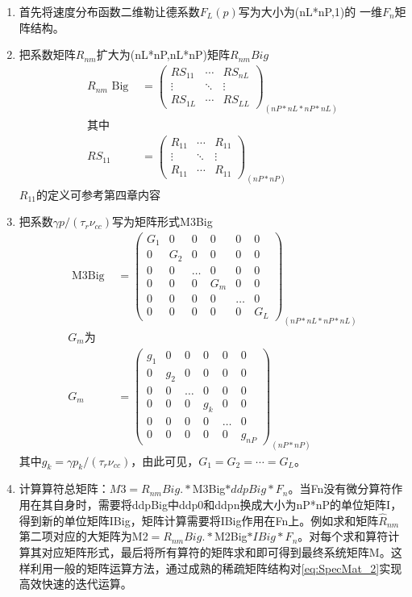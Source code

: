 \begin{enumerate}
\item
首先将速度分布函数二维勒让德系数$F_L(p)$写为大小为(nL*nP,1)的 一维$F_n$矩阵结构。
\item
把系数矩阵$R_{nm}$扩大为(nL*nP,nL*nP)矩阵$R_{nm} Big$
\begin{align}R_{n m} \text { Big } & = \left(\begin{array}{ccc}R S_{11} & \cdots & R S_{n L} \\\vdots & \ddots & \vdots \\R S_{1 L} & \cdots & R S_{L L}\end{array}\right)_{(nP*nL*nP*nL)}\\
\text{其中}\\
R S_{11}&=\left(\begin{array}{ccc}R_{11} & \cdots & R_{11} \\\vdots & \ddots & \vdots \\R_{11} & \cdots & R_{11}\end{array}\right)_{(nP*nP)}
\end{align}
$R_{11}$的定义可参考第四章内容
\item
把系数$γp/(τ_r ν_{cc} )$写为矩阵形式M3Big
\begin{align}\text { M3Big } & = \left(\begin{array}{cccccc}G_{1} & 0 & 0 & 0 & 0 & 0 \\0 & G_{2} & 0 & 0 & 0 & 0 \\0 & 0 & \ldots & 0 & 0 & 0 \\0 & 0 & 0 & G_{m} & 0 & 0 \\0 & 0 & 0 & 0 & \ldots & 0 \\0 & 0 & 0 & 0 & 0 & G_{L}\end{array}\right)_{(nP*nL*nP*nL)}\\
G_m\text{为}\\
 { G_m} & = \left(\begin{array}{cccccc}g_{1} & 0 & 0 & 0 & 0 & 0 \\0 & g_{2} & 0 & 0 & 0 & 0 \\0 & 0 & \ldots & 0 & 0 & 0 \\0 & 0 & 0 & g_{k} & 0 & 0 \\0 & 0 & 0 & 0 & \ldots & 0 \\0 & 0 & 0 & 0 & 0 & g_{nP}\end{array}
\right)_{(nP*nP)}\end{align}
其中$g_k=γp_k/(τ_r ν_{cc} )$，由此可见，$G_1 =G_2=\cdots=G_L$。
\item
计算算符总矩阵：$M3=R_{nm} Big.*$M3Big$*ddpBig*F_n$。当Fn没有微分算符作用在其自身时，需要将ddpBig中ddp0和ddpn换成大小为nP*nP的单位矩阵I，得到新的单位矩阵IBig，矩阵计算需要将IBig作用在Fn上。例如求和矩阵$\hat{R }_{nm}$第二项对应的大矩阵为M2$=R_{nm} Big.*$M2Big$*IBig*F_n$。对每个求和算符计算其对应矩阵形式，最后将所有算符的矩阵求和即可得到最终系统矩阵M。这样利用一般的矩阵运算方法，通过成熟的稀疏矩阵结构对\autoref{eq:SpecMat_2}实现高效快速的迭代运算。
\end{enumerate}

